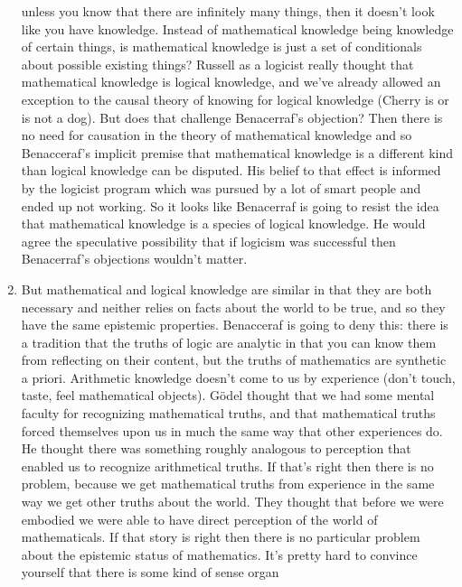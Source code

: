\documentclass[12pt]{article}
\theoremstyle{definition}
\begin{document}
\begin{enumerate}
        unless you know that there are infinitely many things, then it doesn't
        look like you have knowledge. Instead of mathematical knowledge being
        knowledge of certain things, is mathematical knowledge is just a set of
        conditionals about possible existing things? Russell as a logicist
        really thought that mathematical knowledge is logical knowledge, and
        we've already allowed an exception to the causal theory of knowing for
        logical knowledge (Cherry is or is not a dog). But does that challenge
        Benacerraf's objection? Then there is no need for causation in the
        theory of mathematical knowledge and so Benacceraf's implicit premise
        that mathematical knowledge is a different kind than logical knowledge
        can be disputed. His belief to that effect is informed by the logicist
        program which was pursued by a lot of smart people and ended up not
        working. So it looks like Benacerraf is going to resist the idea that
        mathematical knowledge is a species of logical knowledge. He would
        agree the speculative possibility that if logicism was successful then
        Benacerraf's objections wouldn't matter. 
    \item
        But mathematical and logical knowledge are similar in that they are
        both necessary and neither relies on facts about the world to be true,
        and so they have the same epistemic properties. Benacceraf is going to
        deny this: there is a tradition that the truths of logic are analytic
        in that you can know them from reflecting on their content, but the
        truths of mathematics are synthetic a priori. Arithmetic knowledge
        doesn't come to us by experience (don't touch, taste, feel mathematical
        objects). G\"odel thought that we had some mental faculty for
        recognizing mathematical truths, and that mathematical truths forced
        themselves upon us in much the same way that other experiences do. He
        thought there was something roughly analogous to perception that
        enabled us to recognize arithmetical truths. If that's right then there
        is no problem, because we get mathematical truths from experience in
        the same way we get other truths about the world. They thought that
        before we were embodied we were able to have direct perception of the
        world of mathematicals. If that story is right then there is no
        particular problem about the epistemic status of mathematics. It's
        pretty hard to convince yourself that there is some kind of sense organ

\end{enumerate}
\end{document}

